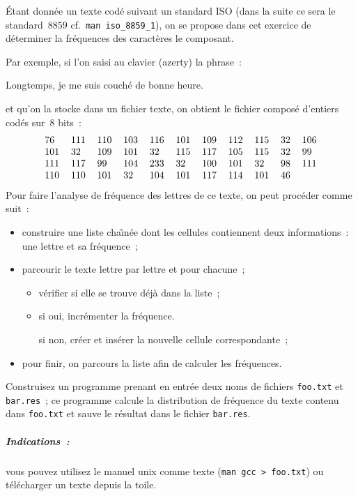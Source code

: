 \begin{exercice}
  \'Etant  donn\'ee un texte cod\'e  suivant  un standard ISO (dans la
  suite ce sera le  standard~$8859$ cf.\ \verb+man iso_8859_1+), on se
  propose  dans cet exercice de     d\'eterminer la fr\'equences   des
  caract\`eres le composant.
  \par
  Par exemple, si l'on saisi au clavier (azerty) la phrase~:
  \par
  \centerline{Longtemps, je me suis couch\'e de bonne heure.}
  \par
  et  qu'on  la stocke dans  un fichier  texte, on  obtient le fichier
  compos\'e d'entiers cod\'es sur~$8$ bits~:
  $$
  \begin{tabular}{lllllllllll}
    76 & 111 & 110 & 103 & 116 & 101 & 109 & 112 & 115 & 32 & 106 \\
    101 & 32 & 109 & 101 & 32 & 115 &  117 & 105 & 115 & 32 & 99  \\
    111 & 117 & 99 & 104 & 233 & 32 & 100 & 101 &  32 & 98 & 111  \\
    110 & 110 & 101 & 32 & 104 & 101 & 117 & 114 & 101 & 46
  \end{tabular}
  $$
  Pour faire  l'analyse de fr\'equence des lettres  de ce texte, on
  peut proc\'eder comme suit~:
  \begin{itemize}
  \item construire  une   liste   cha\^\i{}n\'ee dont   les   cellules
    contiennent deux informations~: une lettre et sa fr\'equence~;
  \item parcourir le texte lettre par lettre et pour chacune~;
    \begin{itemize}
    \item v\'erifier si elle se trouve d\'ej\`a dans la liste~; 
    \item si oui, incr\'ementer la fr\'equence.
      \par
      si non, cr\'eer et ins\'erer la nouvelle cellule correspondante~;
    \end{itemize}
  \item pour finir, on parcours la liste afin de calculer les fr\'equences.
  \end{itemize}
  \par\medskip
  Construisez un  programme prenant en  entr\'ee deux noms de fichiers
  \verb+foo.txt+   et   \verb+bar.res+~;  ce  programme     calcule la
  distribution de fr\'equence du  texte contenu dans \verb+foo.txt+ et
  sauve le r\'esultat dans le fichier \verb+bar.res+.
  
  \subparagraph{Indications~:}%
  vous  pouvez utilisez le  manuel unix comme   texte (\verb+man gcc > foo.txt+) %
  ou t\'el\'echarger un texte depuis la toile.
  \ifcorrection%
  \begin{correction}
  \end{correction}
  \fi%
\end{exercice}

